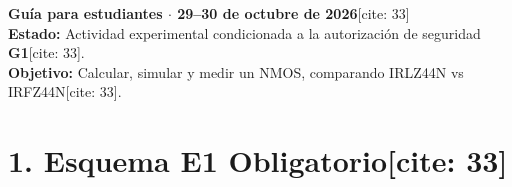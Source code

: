 \documentclass[11pt, a4paper]{article}
\begin{document}
\begin{tcolorbox}[colback=ucbblue!5, colframe=ucbblue, title=\textbf{Hito 3 — Laboratorio E1: NMOS Low-Side con Carga Resistiva[cite: 33]}]
    \textbf{Guía para estudiantes $\cdot$ 29–30 de octubre de 2026}[cite: 33] \\
    \textbf{Estado:} Actividad experimental condicionada a la autorización de seguridad \textbf{G1}[cite: 33]. \\
    \textbf{Objetivo:} Calcular, simular y medir un NMOS, comparando IRLZ44N vs IRFZ44N[cite: 33].
\end{tcolorbox}

\section*{1. Esquema E1 Obligatorio[cite: 33]}
\end{document}
